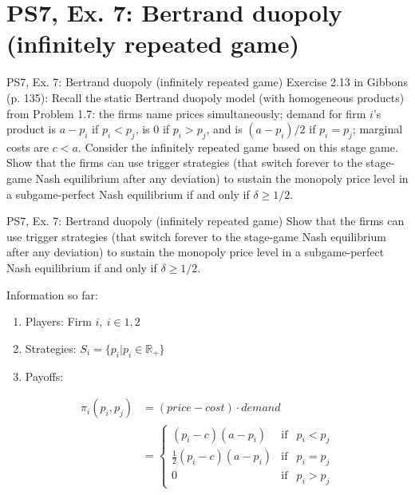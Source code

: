 \section{PS7, Ex. 7: Bertrand duopoly (infinitely repeated game)}

\begin{frame}{PS7, Ex. 7: Bertrand duopoly (infinitely repeated game)}
    Exercise 2.13 in Gibbons (p. 135): Recall the static Bertrand duopoly model (with homogeneous products) from Problem 1.7: the firms name prices simultaneously; demand for firm $i$'s product is $a-p_i$ if $p_i<p_j$, is 0 if $p_i>p_j$, and is $(a-p_i)/2$ if $p_i=p_j$; marginal costs are $c<a$. Consider the infinitely repeated game based on this stage game. Show that the firms can use trigger strategies (that switch forever to the stage-game Nash equilibrium after any deviation) to sustain the monopoly price level in a subgame-perfect Nash equilibrium if and only if $\delta\geq1/2$.
    \vfill\null
\end{frame}

\begin{frame}{PS7, Ex. 7: Bertrand duopoly (infinitely repeated game)}
    Show that the firms can use trigger strategies (that switch forever to the stage-game Nash equilibrium after any deviation) to sustain the monopoly price level in a subgame-perfect Nash equilibrium if and only if $\delta\geq1/2$.
    \begin{multicols}{2}
      \vfill\null\columnbreak
      Information so far:
      \begin{enumerate}
        \item Players: Firm $i,\ i\in1,2$
        \item Strategies: $S_i=\{p_i|p_i\in\mathbb{R}_+\}$
        \item Payoffs:
      \end{enumerate}
      \vspace{-12pt}
      \begin{align*}
        \pi_i(p_i,p_j)&=(price-cost)\cdot demand\\
                      &=\left\{\begin{array}{lcl}
          (p_i-c)(a-p_i)            & \text{if} & p_i<p_j\\
          \frac{1}{2}(p_i-c)(a-p_i) & \text{if} & p_i=p_j\\
          0                         & \text{if} & p_i>p_j
        \end{array}\right.
      \end{align*}
      \vfill\null
    \end{multicols}
\end{frame}

